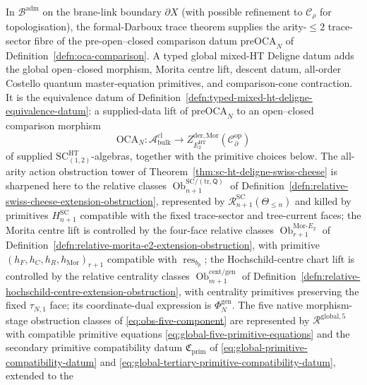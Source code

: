\begin{thm}
\label{thm:typed-global-mixed-ht-deligne}
In $\mathcal B^{\mathrm{adm}}$ on the brane-link boundary $\partial X$
(with possible refinement to $\mathcal C_\rho$ for topologisation), the
formal-Darboux trace theorem supplies the arity-\(\le2\)
trace-sector fibre of the pre-open--closed comparison datum
\(\mathrm{preOCA}_N\) of Definition~\ref{defn:oca-comparison}.  A typed
global mixed-HT Deligne datum adds the global open--closed morphism,
Morita centre lift, descent datum, all-order Costello quantum
master-equation primitives, and comparison-cone contraction.  It is the
equivalence datum of
Definition~\ref{defn:typed-mixed-ht-deligne-equivalence-datum}: a
supplied-data lift of \(\mathrm{preOCA}_N\) to an open--closed
comparison morphism
\[
  \mathrm{OCA}_N\colon\mathcal A^{\mathrm{cl}}_{\mathrm{bulk}}\to
  Z^{\mathrm{der},\mathrm{Mor}}_{E_2^{\mathrm{HT}}}
  (\mathcal C^{\mathrm{op}}_\partial)
\]
of supplied \(\mathrm{SC}^{\mathrm{HT}}_{(1,2)}\)-algebras, together
with the primitive choices below.  The all-arity action obstruction
tower of Theorem~\ref{thm:sc-ht-deligne-swiss-cheese} is sharpened here
to the relative classes
\(\operatorname{Ob}^{\mathrm{SC}/(\mathrm{tr},\mathsf Q)}_{n+1}\) of
Definition~\ref{defn:relative-swiss-cheese-extension-obstruction},
represented by
\(\mathcal R^{\mathrm{SC}}_{n+1}(\Theta_{\le n})\) and killed by
primitives \(H^{\mathrm{SC}}_{n+1}\) compatible with the fixed
trace-sector and tree-current faces; the Morita centre lift is controlled
by the four-face relative classes
  \(\operatorname{Ob}^{\mathrm{Mor}\mbox{-}E_2}_{r+1}\) of
Definition~\ref{defn:relative-morita-e2-extension-obstruction}, with
primitive
\((h_F,h_C,h_R,h_{\mathrm{Mor}})_{r+1}\) compatible with
\(\operatorname{res}_{b_p}\); the Hochschild-centre chart lift is
controlled by the relative centrality classes
\(\operatorname{Ob}^{\mathrm{cent}/\mathrm{gen}}_{m+1}\) of
Definition~\ref{defn:relative-hochschild-centre-extension-obstruction},
with centrality primitives preserving the fixed
\(\tau_{N,1}\) face; its coordinate-dual expression is
\(\Phi_N^{\mathrm{gen}}\).  The five native morphism-stage obstruction
classes of \eqref{eq:obs-five-component} are represented by
\(\mathcal R^{\mathrm{global},5}\) with compatible primitive equations
\eqref{eq:global-five-primitive-equations} and the secondary primitive
compatibility datum
\(\mathfrak C_{\mathrm{prim}}\) of
\eqref{eq:global-primitive-compatibility-datum} and
\eqref{eq:global-tertiary-primitive-compatibility-datum}, extended to the

\end{thm}
